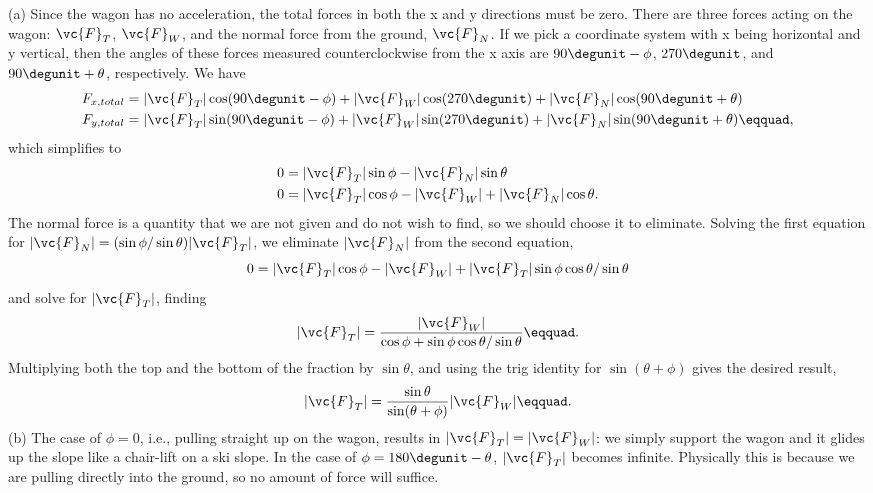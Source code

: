 (a) Since the wagon has no acceleration, the total
forces in both the x and y directions must be zero.
There are three forces acting on the wagon: $\vc{F}_T$, $\vc{F}_W$,
and the normal force from the ground, $\vc{F}_N$. If we pick a
coordinate system with x being horizontal and y
vertical, then the angles of these forces measured
counterclockwise from the x axis are $90\degunit-\phi$,
$270\degunit$, and $90\degunit+\theta$, respectively. We have
\begin{align*}
    F_{x,total}
             & =   |\vc{F}_T|\cos (90\degunit-\phi ) 
                 + |\vc{F}_W|\cos (270\degunit)
                 + |\vc{F}_N|\cos (90\degunit+\theta )\\
    F_{y,total}
             & =  |\vc{F}_T|\sin (90\degunit-\phi )
                + |\vc{F}_W|\sin (270\degunit)
                + |\vc{F}_N|\sin (90\degunit+\theta )\eqquad,
\end{align*}
which simplifies to
\begin{align*}
        0  &=  |\vc{F}_T|\sin  \phi  - |\vc{F}_N|\sin  \theta   \\
        0  &=  |\vc{F}_T|\cos  \phi   - |\vc{F}_W| + |\vc{F}_N|\cos  \theta   .
\end{align*}
The normal force is a quantity that we are not given and do
not wish to find, so we should choose it to eliminate.
Solving the first equation for $|\vc{F}_N|=(\sin  \phi/\sin  \theta)|\vc{F}_T|$,
 we eliminate $|\vc{F}_N|$ from the second equation,
\begin{equation*}
        0  =   |\vc{F}_T|\cos  \phi   
             - |\vc{F}_W| + |\vc{F}_T|\sin  \phi \cos  \theta/\sin  \theta
\end{equation*}
and solve for $|\vc{F}_T|$, finding
\begin{equation*}
    |\vc{F}_T| = \frac{|\vc{F}_W|}{\cos\phi+\sin\phi\cos\theta/\sin\theta}\eqquad.
\end{equation*}
Multiplying both the top and the bottom of the fraction by
$\sin  \theta $, and using the trig identity for 
$\sin(\theta +\phi )$ gives the desired result,
\begin{equation*}
    |\vc{F}_T| = \frac{\sin\theta}{\sin(\theta+\phi)} |\vc{F}_W|\eqquad.
\end{equation*}
(b) The case of $\phi=0$, i.e., pulling straight up on the
wagon, results in $|\vc{F}_T|=|\vc{F}_W|$: we simply support the wagon and
it glides up the slope like a chair-lift on a ski slope. In
the case of $\phi =180\degunit-\theta$, $|\vc{F}_T|$ becomes infinite.
Physically this is because we are pulling directly into the
ground, so no amount of force will suffice.
